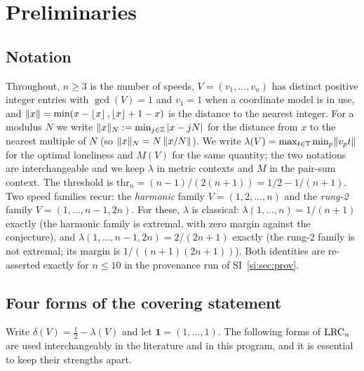 
\section{Preliminaries}\label{sec:prelim}

\subsection{Notation}

Throughout, $n\ge 3$ is the number of speeds, $V=(v_1,\dots,v_n)$ has
distinct positive integer entries with $\gcd(V)=1$ and $v_1=1$ when a
coordinate model is in use, and $\lVert x \rVert=\min(x-\left\lfloor x \right\rfloor,
\left\lfloor x \right\rfloor+1-x)$ is the distance to the nearest integer. For a modulus
$N$ we write $\lVert x \rVert_{N}:=\min_{j\in\mathbb{Z}}|x-jN|$ for the distance from $x$ to
the nearest multiple of $N$ (so $\lVert x \rVert_{N}=N\,\lVert x/N \rVert$). We write
$\lambda(V)=\max_{t\in\mathbb{T}}\min_p \lVert v_p t \rVert$ for the optimal loneliness
and $M(V)$ for the same quantity; the two notations are interchangeable
and we keep $\lambda$ in metric contexts and $M$ in the
pair-sum context. The threshold is
$\mathrm{thr}_n=(n-1)/(2(n+1))=1/2-1/(n+1)$. Two speed families recur:
the \emph{harmonic} family $V=(1,2,\dots,n)$ and the \emph{rung-2}
family $V=(1,\dots,n-1,2n)$. For these, $\lambda$ is classical:
$\lambda(1,\dots,n)=1/(n+1)$ exactly (the harmonic family is extremal,
with zero margin against the conjecture), and
$\lambda(1,\dots,n-1,2n)=2/(2n+1)$ exactly (the rung-2 family is not
extremal; its margin is $1/((n+1)(2n+1))$). Both identities are
re-asserted exactly for $n\le 10$ in the provenance run of
SI~\ref{si:sec:prov}.

\subsection{Four forms of the covering statement}

Write $\delta(V)=\tfrac12-\lambda(V)$ and let $\mathbf{1}=(1,\dots,1)$.
The following forms of $\mathrm{LRC}_n$ are used interchangeably in the
literature and in this program, and it is essential to keep their
strengths apart.

